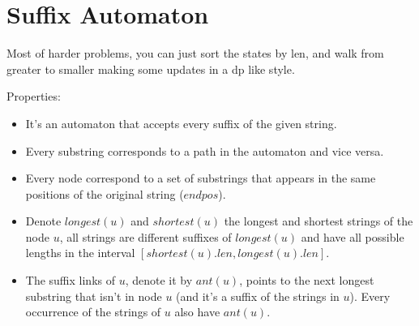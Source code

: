 \section{Suffix Automaton}
Most of harder problems, you can just sort the states by len, and walk from greater to smaller making some updates in a dp like style.

Properties:
\begin{itemize}
    \item It's an automaton that accepts every suffix of the given string.
    \item Every substring corresponds to a path in the automaton and vice versa.
    \item Every node correspond to a set of substrings that appears in the same positions of the original string ($endpos$).
    \item Denote $longest(u)$ and $shortest(u)$ the longest and shortest strings of the node $u$, all strings are different suffixes of $longest(u)$ and have all
possible lengths in the interval $[shortest(u).len,longest(u).len]$.
    \item The suffix links of $u$, denote it by $ant(u)$, points to the next longest substring that isn't in node $u$ (and it's a suffix of the strings in $u$).
Every occurrence of the strings of $u$ also have $ant(u)$. 
\end{itemize}

